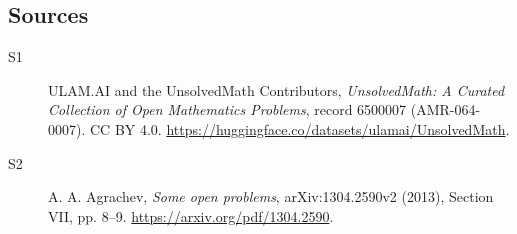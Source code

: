 \documentclass[11pt]{article}
\begin{document}
\subsection{Sources}
\begin{description}
\item[\hypertarget{source:6500007:1}{S1}] ULAM.AI and the UnsolvedMath Contributors, \emph{UnsolvedMath: A Curated Collection of Open Mathematics Problems}, record 6500007 (AMR-064-0007). CC BY 4.0. \url{https://huggingface.co/datasets/ulamai/UnsolvedMath}.
\item[\hypertarget{source:6500007:2}{S2}] A. A. Agrachev, \emph{Some open problems}, arXiv:1304.2590v2 (2013), Section VII, pp. 8--9. \url{https://arxiv.org/pdf/1304.2590}.
\end{description}
\label{end:6500007}
\end{document}
